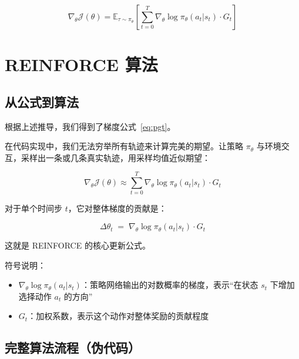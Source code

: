\documentclass[12pt,a4paper]{article}
\newcommand{\E}{\mathbb{E}}
\newcommand{\grad}{\nabla}
\theoremstyle{noteplain}
\theoremstyle{noteexercise}
\begin{document}
\begin{equation}\label{eq:pgt}
  \grad_\theta \mathcal{J}(\theta)
  = \E_{\tau\sim\pi_\theta}\left[
    \sum_{t=0}^{T} \grad_\theta \log \pi_\theta(a_t|s_t) \cdot G_t
  \right]
\end{equation}

\section{REINFORCE 算法}\label{sec:reinforce}

\subsection{从公式到算法}\label{ssec:reinforce-formula}

根据上述推导，我们得到了梯度公式~\eqref{eq:pgt}。

在代码实现中，我们无法穷举所有轨迹来计算完美的期望。让策略 $\pi_\theta$ 与环境交互，采样出一条或几条真实轨迹，用采样均值近似期望：

\begin{equation}\label{eq:mc-approx}
  \grad_\theta \mathcal{J}(\theta) \approx \sum_{t=0}^{T} \grad_\theta \log \pi_\theta(a_t|s_t) \cdot G_t
\end{equation}

对于单个时间步 $t$，它对整体梯度的贡献是：

\begin{equation}\label{eq:delta-theta}
  \Delta\theta_t \;=\; \grad_\theta \log \pi_\theta(a_t|s_t) \cdot G_t
\end{equation}

这就是 REINFORCE 的核心更新公式。

符号说明：
\begin{itemize}
  \setlength{\itemsep}{0.2em}
  \item $\grad_\theta \log \pi_\theta(a_t|s_t)$：策略网络输出的对数概率的梯度，表示``在状态 $s_t$ 下增加选择动作 $a_t$ 的方向''
  \item $G_t$：加权系数，表示这个动作对整体奖励的贡献程度
\end{itemize}

\subsection{完整算法流程（伪代码）}\label{ssec:reinforce-pseudocode}
\end{document}
